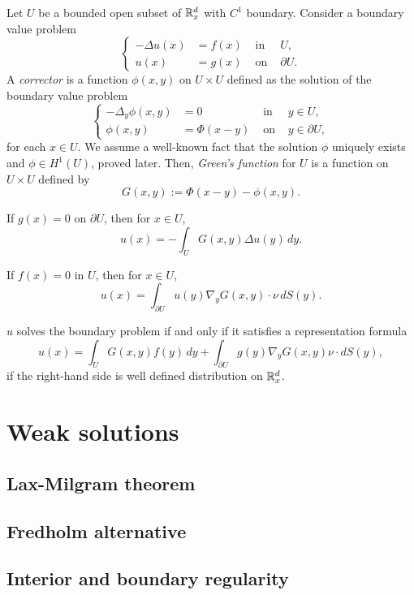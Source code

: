 \documentclass{../note}
\begin{document}
\begin{prb}
Let $U$ be a bounded open subset of $\mathbb{R}_x^d$ with $C^1$ boundary.
Consider a boundary value problem
\[\left\{\begin{alignedat}{2}
-\Delta u(x)&=f(x) & \text{ in }&U,\\
u(x)&=g(x) & \text{ on }&\partial U.
\end{alignedat}\right.\]
A \emph{corrector} is a function $\phi(x,y)$ on $U\times U$ defined as the solution of the boundary value problem
\[\left\{\begin{alignedat}{2}
-\Delta_y\phi(x,y)&=0 & \text{ in }&y\in U,\\
\phi(x,y)&=\Phi(x-y) & \text{ on }&y\in\partial U,
\end{alignedat}\right.\]
for each $x\in U$.
We assume a well-known fact that the solution $\phi$ uniquely exists and $\phi\in H^1(U)$, proved later.
Then, \emph{Green's function} for $U$ is a function on $U\times U$ defined by
\[G(x,y):=\Phi(x-y)-\phi(x,y).\]
\begin{parts}
\item If $g(x)=0$ on $\partial U$, then for $x\in U$,
\[u(x)=-\int_UG(x,y)\Delta u(y)\,dy.\]
\item If $f(x)=0$ in $U$, then for $x\in U$,
\[u(x)=\int_{\partial U}u(y)\nabla_yG(x,y)\cdot\nu\,dS(y).\]
\item $u$ solves the boundary problem if and only if it satisfies a representation formula
\[u(x)=\int_UG(x,y)f(y)\,dy+\int_{\partial U}g(y)\nabla_yG(x,y)\nu\cdot dS(y),\]
if the right-hand side is well defined distribution on $\mathbb{R}_x^d$.
\end{parts}
\end{prb}
\begin{pf}
\end{pf}


\chapter{Weak solutions}
\section{Lax-Milgram theorem}
\section{Fredholm alternative}
\section{Interior and boundary regularity}
\end{document}

